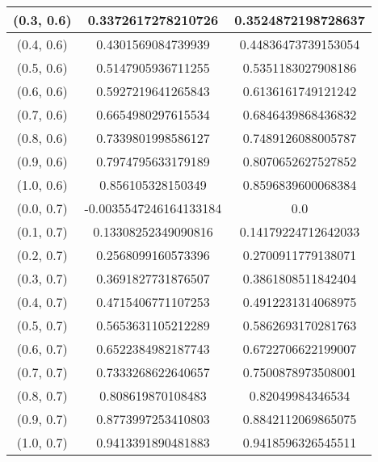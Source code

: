 \begin{table}[H]
\begin{tabular}{|c|c|c|}
\hline
(0.3, 0.6) & 0.3372617278210726 & 0.3524872198728637 \\
\hline
(0.4, 0.6) & 0.4301569084739939 & 0.44836473739153054 \\
\hline
(0.5, 0.6) & 0.5147905936711255 & 0.5351183027908186 \\
\hline
(0.6, 0.6) & 0.5927219641265843 & 0.6136161749121242 \\
\hline
(0.7, 0.6) & 0.6654980297615534 & 0.6846439868436832 \\
\hline
(0.8, 0.6) & 0.7339801998586127 & 0.7489126088005787 \\
\hline
(0.9, 0.6) & 0.7974795633179189 & 0.8070652627527852 \\
\hline
(1.0, 0.6) & 0.856105328150349 & 0.8596839600068384 \\
\hline
\hline
(0.0, 0.7) & -0.0035547246164133184 & 0.0 \\
\hline
(0.1, 0.7) & 0.13308252349090816 & 0.14179224712642033 \\
\hline
(0.2, 0.7) & 0.2568099160573396 & 0.2700911779138071 \\
\hline
(0.3, 0.7) & 0.3691827731876507 & 0.3861808511842404 \\
\hline
(0.4, 0.7) & 0.4715406771107253 & 0.4912231314068975 \\
\hline
(0.5, 0.7) & 0.5653631105212289 & 0.5862693170281763 \\
\hline
(0.6, 0.7) & 0.6522384982187743 & 0.6722706622199007 \\
\hline
(0.7, 0.7) & 0.7333268622640657 & 0.7500878973508001 \\
\hline
(0.8, 0.7) & 0.808619870108483 & 0.82049984346534 \\
\hline
(0.9, 0.7) & 0.8773997253410803 & 0.8842112069865075 \\
\hline
(1.0, 0.7) & 0.9413391890481883 & 0.9418596326545511 \\
\hline
\end{tabular}
\end{table}
